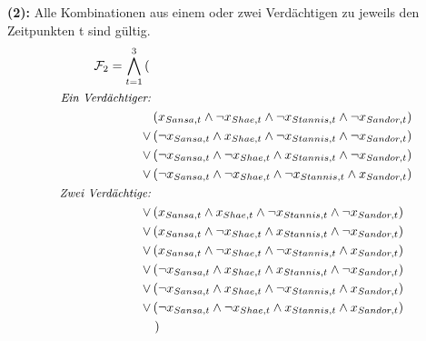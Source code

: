 \documentclass{article}
\begin{document}
\textbf{(2): }Alle Kombinationen aus einem oder zwei Verdächtigen zu jeweils den Zeitpunkten t sind gültig.
\begin{align*}
\mathcal{F}_{2}=
\bigwedge\limits_{t=1}^{3} \left(\right. & \\
\text{\small\textit{Ein Verdächtiger:}} \\
                                         & \left(      x_{Sansa,t} \wedge \neg x_{Shae,t} \wedge \neg x_{Stannis,t} \wedge \neg x_{Sandor,t} \right)\\
                                    \vee & \left( \neg x_{Sansa,t} \wedge      x_{Shae,t} \wedge \neg x_{Stannis,t} \wedge \neg x_{Sandor,t} \right)\\
                                    \vee & \left( \neg x_{Sansa,t} \wedge \neg x_{Shae,t} \wedge      x_{Stannis,t} \wedge \neg x_{Sandor,t} \right)\\
                                    \vee & \left( \neg x_{Sansa,t} \wedge \neg x_{Shae,t} \wedge \neg x_{Stannis,t} \wedge      x_{Sandor,t} \right)\\
\text{\small\textit{Zwei Verdächtige:}} \\
                                    \vee & \left(      x_{Sansa,t} \wedge      x_{Shae,t} \wedge \neg x_{Stannis,t} \wedge \neg x_{Sandor,t} \right)\\
                                    \vee & \left(      x_{Sansa,t} \wedge \neg x_{Shae,t} \wedge      x_{Stannis,t} \wedge \neg x_{Sandor,t} \right)\\
                                    \vee & \left(      x_{Sansa,t} \wedge \neg x_{Shae,t} \wedge \neg x_{Stannis,t} \wedge      x_{Sandor,t} \right)\\
                                    \vee & \left( \neg x_{Sansa,t} \wedge      x_{Shae,t} \wedge      x_{Stannis,t} \wedge \neg x_{Sandor,t} \right)\\
                                    \vee & \left( \neg x_{Sansa,t} \wedge      x_{Shae,t} \wedge \neg x_{Stannis,t} \wedge      x_{Sandor,t} \right)\\
                                    \vee & \left( \neg x_{Sansa,t} \wedge \neg x_{Shae,t} \wedge      x_{Stannis,t} \wedge      x_{Sandor,t} \right)\\ 
                                         & \left.\right)
\end{align*}
\end{document}
